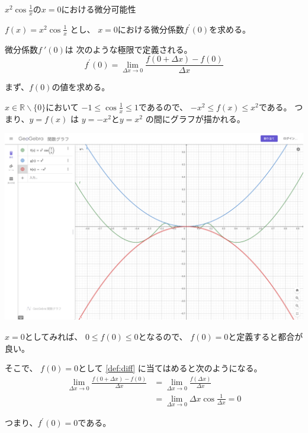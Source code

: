 \documentclass[12pt,b5paper]{ltjsarticle}
\begin{document}
\hrulefill

$x^{2}\cos{\frac{1}{x}}$の$x=0$における微分可能性

\dotfill


$f(x)=x^{2}\cos{\frac{1}{x}}$
とし、
$x=0$における微分係数$f^{\prime}(0)$を求める。

微分係数$f~{\prime}(0)$は
次のような極限で定義される。
\begin{equation}\label{def:diff}
 f^{\prime}(0)
  =
  \lim_{\Delta x \to 0}\frac{f(0+\Delta x)-f(0)}{\Delta x}
\end{equation}


まず、$f(0)$の値を求める。

$x\in\mathbb{R}\backslash \{0\}$において
$-1 \leq \cos{\frac{1}{x}} \leq 1$であるので、
$-x^{2} \leq f(x) \leq x^{2}$である。
つまり、$y=f(x)$ は
$y=-x^{2}$と$y=x^{2}$
の間にグラフが描かれる。 

\begin{center}
 \includegraphics[scale=0.34]{graph_x2.png}
\end{center}



$x=0$としてみれば、
$0 \leq f(0) \leq 0$となるので、
$f(0)=0$と定義すると都合が良い。

そこで、
$f(0)=0$として
\eqref{def:diff}
に当てはめると次のようになる。
\begin{align}
  \lim_{\Delta x \to 0}\frac{f(0+\Delta x)-f(0)}{\Delta x}
  & =
  \lim_{\Delta x \to 0}\frac{f(\Delta x)}{\Delta x}\\
  & =
  \lim_{\Delta x \to 0}
  \Delta x \cos{\frac{1}{\Delta x}}
 =0
\end{align}

つまり、$f^{\prime}(0)=0$である。
\end{document}
